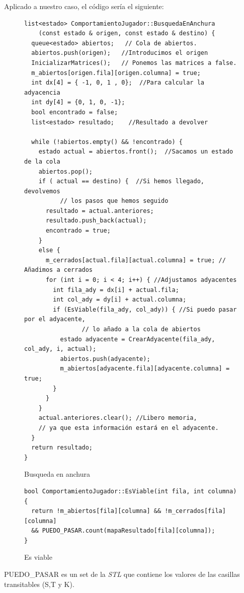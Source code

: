 \documentclass[12pt,spanish]{article}
\begin{document}
Aplicado a nuestro caso, el código sería el siguiente:

\begin{figure}[H]
\centering
\begin{verbatim}
list<estado> ComportamientoJugador::BusquedaEnAnchura
    (const estado & origen, const estado & destino) {
  queue<estado> abiertos;   // Cola de abiertos.
  abiertos.push(origen);   //Introducimos el origen
  InicializarMatrices();   // Ponemos las matrices a false.
  m_abiertos[origen.fila][origen.columna] = true;
  int dx[4] = { -1, 0, 1 , 0};  //Para calcular la adyacencia 
  int dy[4] = {0, 1, 0, -1};
  bool encontrado = false; 
  list<estado> resultado;    //Resultado a devolver

  while (!abiertos.empty() && !encontrado) {  
    estado actual = abiertos.front();  //Sacamos un estado de la cola
    abiertos.pop();
    if ( actual == destino) {  //Si hemos llegado, devolvemos 
          // los pasos que hemos seguido
      resultado = actual.anteriores;
      resultado.push_back(actual);
      encontrado = true;
    }
    else {
      m_cerrados[actual.fila][actual.columna] = true; // Añadimos a cerrados
      for (int i = 0; i < 4; i++) { //Adjustamos adyacentes
        int fila_ady = dx[i] + actual.fila;
        int col_ady = dy[i] + actual.columna;
        if (EsViable(fila_ady, col_ady)) { //Si puedo pasar por el adyacente, 
                // lo añado a la cola de abiertos
          estado adyacente = CrearAdyacente(fila_ady, col_ady, i, actual);
          abiertos.push(adyacente);
          m_abiertos[adyacente.fila][adyacente.columna] = true;
        }
      }
    }
    actual.anteriores.clear(); //Libero memoria,
    // ya que esta información estará en el adyacente.
  }
  return resultado;
}
\end{verbatim}
\caption{Busqueda en anchura}
\end{figure}

\begin{figure}[H]
\centering
\begin{verbatim}
bool ComportamientoJugador::EsViable(int fila, int columna) {
  return !m_abiertos[fila][columna] && !m_cerrados[fila][columna] 
  && PUEDO_PASAR.count(mapaResultado[fila][columna]);
}
\end{verbatim}
\caption{Es viable}
\end{figure}

PUEDO\_PASAR es un set de la \emph{STL} que contiene los valores de las casillas transitables (S,T y K).
\end{document}
